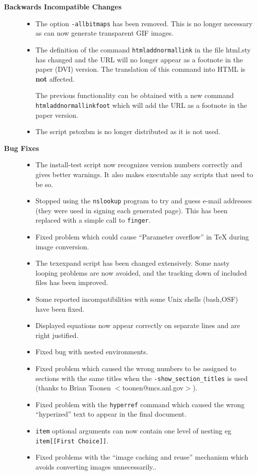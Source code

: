 \begin{description}
\item[{\bf Backwards Incompatible Changes}] \hfill
\begin{itemize}
\item The option {\tt -allbitmaps} has been removed. This is no
longer necessary as \latextohtml can now generate transparent
GIF images.
\item The definition of the command {\tt htmladdnormallink} in the 
file {\fn html.sty} has changed and the URL will no longer appear
as a footnote in the paper (DVI) version. The translation of
this command into HTML is {\bf not} affected. 

The previous functionality can be obtained with a new command
{\tt htmladdnormallinkfoot} which will add the URL as a footnote
in the paper version.
\item The script {\fn pstoxbm} is no longer distributed as it is not
used.

\end{itemize}

\item[{\bf Bug Fixes}] \hfill
\begin{itemize}
\item The {\fn install-test} script now recognizes version
numbers correctly and gives better warnings. It also makes
executable any scripts that need to be so. 
\item Stopped using the {\tt nslookup} program to try and guess
e-mail addresses (they were used in signing each generated page). 
This has been replaced with a simple call 
to {\tt finger}.
\item Fixed problem which could cause ``Parameter overflow'' in 
TeX during image conversion.
\item The {\fn texexpand} script has been changed extensively.
Some nasty looping problems are now avoided, and the tracking
down of included files has been improved.
\item Some reported incompatibilities with some Unix shells
(bash,OSF) have been fixed.
\item Displayed equations now appear correctly on separate
lines and are right justified.
\item Fixed bug with nested environments.
\item Fixed problem which caused the wrong numbers to be assigned
to sections with the same titles when the {\tt -show\_section\_titles}
is used (thanks to Brian  Toonen $<$toonen@mcs.anl.gov$>$).
\item Fixed problem with the {\tt hyperref} command which
caused the wrong ``hyperized'' text to appear in the final document.
\item {\tt item} optional arguments can now contain one level of
nesting eg {\tt item[[First Choice]]}.
\item Fixed problems with the ``image caching and reuse'' mechanism 
which avoids converting images unnecessarily..
\end{itemize}


\end{description}
